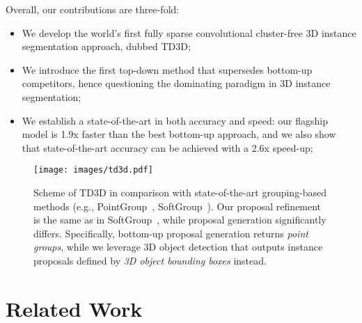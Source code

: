 \documentclass[10pt,twocolumn,letterpaper]{article}
\begin{document}
Overall, our contributions are three-fold: \begin{itemize}
    \item We develop the world's first fully sparse convolutional cluster-free 3D instance segmentation approach, dubbed TD3D; 
    \item We introduce the first top-down method that supersedes bottom-up competitors, hence questioning the dominating paradigm in 3D instance segmentation; 
    \item We establish a state-of-the-art in both accuracy and speed: our flagship model is 1.9x faster than the best bottom-up approach, and we also show that state-of-the-art accuracy can be achieved with a 2.6x speed-up;
\end{itemize}

\begin{figure*}[t]
    \begin{center}
        \texttt{[image: images/td3d.pdf]}
    \end{center}
    \caption{Scheme of TD3D in comparison with state-of-the-art grouping-based methods (e.g., PointGroup~\cite{jiang2020pointgroup}, SoftGroup~\cite{vu2022softgroup}). Our proposal refinement is the same as in SoftGroup~\cite{vu2022softgroup}, while proposal generation significantly differs. Specifically, bottom-up proposal generation returns \textit{point groups}, while we leverage 3D object detection that outputs instance proposals defined by \textit{3D object bounding boxes} instead.}
\label{fig:scheme}
\end{figure*}

\section{Related Work}
\label{sec:related}
\end{document}
